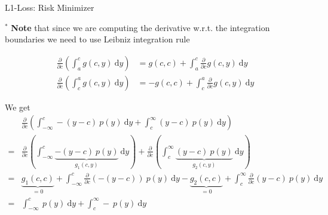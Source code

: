 \documentclass[11pt,compress,t,notes=noshow, xcolor=table]{beamer}
\begin{document}
\begin{frame2}[footnotesize]{L1-Loss: Risk Minimizer}

$^\ast$ \textbf{Note} that since we are computing the derivative w.r.t. the integration boundaries we need to use Leibniz integration rule 

\begin{align*}
\frac{\partial}{\partial c} (\int_a^c g(c, y) ~\text{d}y) &= g(c, c) + \int_a^c \frac{\partial}{\partial c} g(c, y) ~\text{d}y \\
\frac{\partial}{\partial c} (\int_c^a g(c, y) ~\text{d}y) &= - g(c, c) + \int_c^a \frac{\partial}{\partial c} g(c, y) ~\text{d}y    
\end{align*}

We get 
\begin{align*}
&\frac{\partial}{\partial c} (\int_{-\infty}^c -(y - c)~p(y)~\text{d}y + \int_c^\infty (y - c)~p(y)~\text{d}y ) \\
=& \frac{\partial}{\partial c} (\int_{-\infty}^c \underbrace{-(y - c)~p(y)}_{g_1(c, y)}~\text{d}y) + \frac{\partial}{\partial c} (\int_c^\infty \underbrace{(y - c)~p(y)}_{g_2(c, y)}~\text{d}y ) \\
=& \underbrace{g_1(c, c)}_{=0} + \int_{-\infty}^c \frac{\partial}{\partial c}  (-(y - c))~p(y)~\text{d}y - \underbrace{g_2(c, c)}_{= 0} + \int_c^\infty \frac{\partial}{\partial c}  (y - c)~p(y)~\text{d}y \\
=& \int_{-\infty}^c  ~p(y)~\text{d}y + \int_c^\infty -~p(y)~\text{d}y
\end{align*}

\end{frame2}
\end{document}
